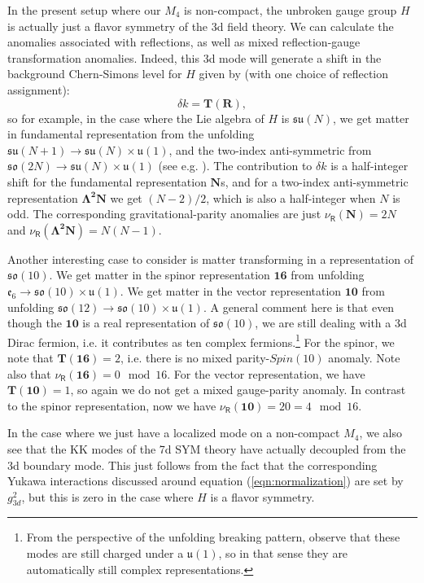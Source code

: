 \documentclass[12pt]{article}%
\numberwithin{equation}{section}
\renewcommand{\(}{\left(}
\renewcommand{\)}{\right)}
\renewcommand{\[}{\left[}
\renewcommand{\]}{\right]}
\begin{document}
In the present setup where our $M_4$ is non-compact, the unbroken gauge group $H$ is actually just a flavor symmetry of the 3d field theory.
We can calculate the anomalies associated with reflections, as well as mixed reflection-gauge transformation anomalies. Indeed, this 3d mode
will generate a shift in the background Chern-Simons level for $H$ given by (with one choice of reflection assignment):
\begin{equation}
\delta k= \mathbf{T}(\mathbf{R}),
\end{equation}
so for example, in the case where the Lie algebra of $H$ is $\mathfrak{su}(N)$, we get matter in fundamental representation from the unfolding $\mathfrak{su}(N+1) \rightarrow \mathfrak{su}(N) \times \mathfrak{u}(1)$, and the two-index anti-symmetric from $\mathfrak{so}(2N) \rightarrow \mathfrak{su}(N) \times \mathfrak{u}(1)$ (see e.g. \cite{Katz:1996xe}). The contribution to $\delta k$ is a half-integer shift for the fundamental representation $\mathbf{N}$s, and for a two-index anti-symmetric representation $\mathbf{\Lambda^{2} N}$ we get $(N-2)/2$, which is also a half-integer when $N$ is odd. The corresponding gravitational-parity anomalies are just $\nu_{\mathsf{R}}(\mathbf{N}) = 2N$ and $\nu_{\mathsf{R}}(\mathbf{\Lambda^{2} N}) = N(N-1)$.

Another interesting case to consider is matter transforming in a representation of $\mathfrak{so}(10)$.
We get matter in the spinor representation $\mathbf{16}$ from unfolding $\mathfrak{e}_6 \rightarrow \mathfrak{so}(10) \times \mathfrak{u}(1)$.
We get matter in the vector representation $\mathbf{10}$ from unfolding $\mathfrak{so}(12) \rightarrow \mathfrak{so}(10) \times \mathfrak{u}(1)$. A general comment here is that even though the $\mathbf{10}$ is a real representation of $\mathfrak{so}(10)$, we are still dealing with a 3d Dirac fermion, i.e. it contributes as ten complex fermions.\footnote{From the perspective of the unfolding breaking pattern, observe that these modes are still charged under a $\mathfrak{u}(1)$, so in that sense they are automatically still complex representations.} For the spinor, we note that $\mathbf{T}(\mathbf{16}) = 2$, i.e. there is no mixed parity-$Spin(10)$ anomaly. Note also that $\nu_{\mathsf{R}}(\mathbf{16}) = 0 \mod 16$. For the vector representation, we have $\mathbf{T}(\mathbf{10}) = 1$, so again we do not get a mixed gauge-parity anomaly. In contrast to the spinor
representation, now we have $\nu_{\mathsf{R}}(\mathbf{10}) = 20 = 4 \mod 16$.

In the case where we just have a localized mode on a non-compact $M_4$,
we also see that the KK modes of the 7d SYM theory have actually decoupled from the 3d boundary mode. This just follows from the
fact that the corresponding Yukawa interactions discussed around equation (\ref{eqn:normalization})
are set by $g^2_{3d}$, but this is zero in the case where $H$ is a flavor symmetry.
\end{document}
